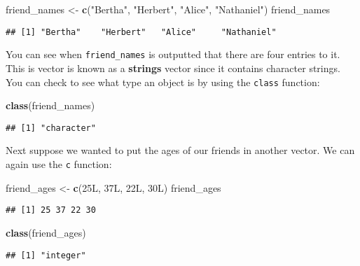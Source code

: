 \documentclass[]{tufte-book}
\newenvironment{Shaded}{\begin{snugshade}}{\end{snugshade}}
\newcommand{\KeywordTok}[1]{\textcolor[rgb]{0.13,0.29,0.53}{\textbf{#1}}}
\newcommand{\NormalTok}[1]{#1}
\newcommand{\StringTok}[1]{\textcolor[rgb]{0.31,0.60,0.02}{#1}}
\begin{document}
\begin{Shaded}
\begin{Highlighting}[]
\NormalTok{friend\_names <{-}}\StringTok{ }\KeywordTok{c}\NormalTok{(}\StringTok{"Bertha"}\NormalTok{, }\StringTok{"Herbert"}\NormalTok{, }\StringTok{"Alice"}\NormalTok{, }\StringTok{"Nathaniel"}\NormalTok{)}
\NormalTok{friend\_names}
\end{Highlighting}
\end{Shaded}

\begin{verbatim}
## [1] "Bertha"    "Herbert"   "Alice"     "Nathaniel"
\end{verbatim}

You can see when \texttt{friend\_names} is outputted that there are four entries to it. This is vector is known as a \textbf{strings} vector since it contains character strings. You can check to see what type an object is by using the \texttt{class} function:

\begin{Shaded}
\begin{Highlighting}[]
\KeywordTok{class}\NormalTok{(friend\_names)}
\end{Highlighting}
\end{Shaded}

\begin{verbatim}
## [1] "character"
\end{verbatim}

Next suppose we wanted to put the ages of our friends in another vector. We can again use the \texttt{c} function:

\begin{Shaded}
\begin{Highlighting}[]
\NormalTok{friend\_ages <{-}}\StringTok{ }\KeywordTok{c}\NormalTok{(25L, 37L, 22L, 30L)}
\NormalTok{friend\_ages}
\end{Highlighting}
\end{Shaded}

\begin{verbatim}
## [1] 25 37 22 30
\end{verbatim}

\begin{Shaded}
\begin{Highlighting}[]
\KeywordTok{class}\NormalTok{(friend\_ages)}
\end{Highlighting}
\end{Shaded}

\begin{verbatim}
## [1] "integer"
\end{verbatim}
\end{document}
